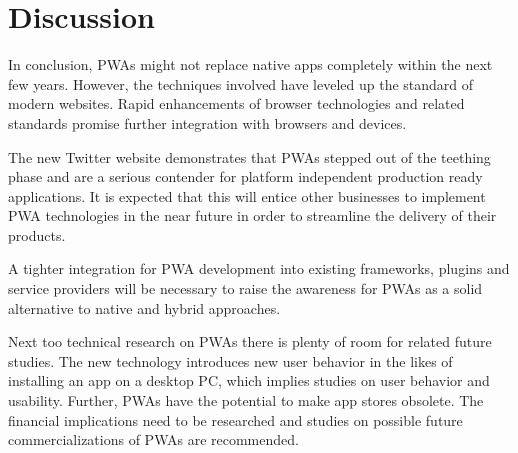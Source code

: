 \chapter{Discussion}

In conclusion, PWAs might not replace native apps completely within the next few years. However, the techniques involved have leveled up the standard of modern websites. Rapid enhancements of browser technologies and related standards promise further integration with browsers and devices.

The new Twitter website demonstrates that PWAs stepped out of the teething phase and are a serious contender for platform independent production ready applications. It is expected that this will entice other businesses to implement PWA technologies in the near future in order to streamline the delivery of their products.

A tighter integration for PWA development into existing frameworks, plugins and service providers will be necessary to raise the awareness for PWAs as a solid alternative to native and hybrid approaches.

Next too technical research on PWAs there is plenty of room for related future studies. The new technology introduces new user behavior in the likes of installing an app on a desktop PC, which implies studies on user behavior and usability. Further, PWAs have the potential to make app stores obsolete. The financial implications need to be researched and studies on possible future commercializations of PWAs are recommended.
